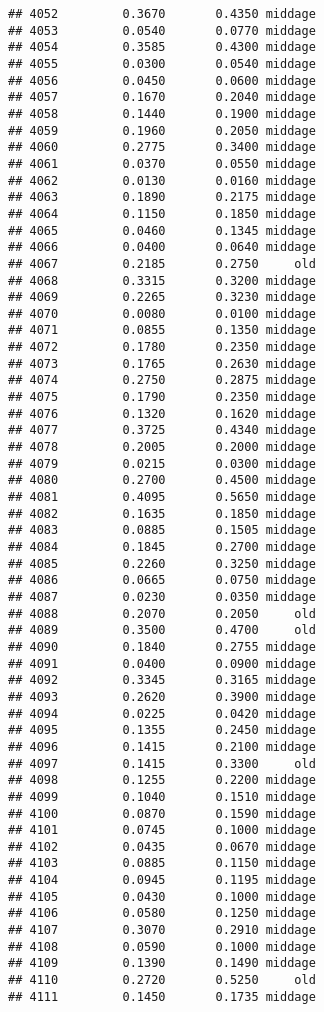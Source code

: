 \documentclass[
]{article}
\begin{document}
\begin{verbatim}
## 4052         0.3670       0.4350 middage
## 4053         0.0540       0.0770 middage
## 4054         0.3585       0.4300 middage
## 4055         0.0300       0.0540 middage
## 4056         0.0450       0.0600 middage
## 4057         0.1670       0.2040 middage
## 4058         0.1440       0.1900 middage
## 4059         0.1960       0.2050 middage
## 4060         0.2775       0.3400 middage
## 4061         0.0370       0.0550 middage
## 4062         0.0130       0.0160 middage
## 4063         0.1890       0.2175 middage
## 4064         0.1150       0.1850 middage
## 4065         0.0460       0.1345 middage
## 4066         0.0400       0.0640 middage
## 4067         0.2185       0.2750     old
## 4068         0.3315       0.3200 middage
## 4069         0.2265       0.3230 middage
## 4070         0.0080       0.0100 middage
## 4071         0.0855       0.1350 middage
## 4072         0.1780       0.2350 middage
## 4073         0.1765       0.2630 middage
## 4074         0.2750       0.2875 middage
## 4075         0.1790       0.2350 middage
## 4076         0.1320       0.1620 middage
## 4077         0.3725       0.4340 middage
## 4078         0.2005       0.2000 middage
## 4079         0.0215       0.0300 middage
## 4080         0.2700       0.4500 middage
## 4081         0.4095       0.5650 middage
## 4082         0.1635       0.1850 middage
## 4083         0.0885       0.1505 middage
## 4084         0.1845       0.2700 middage
## 4085         0.2260       0.3250 middage
## 4086         0.0665       0.0750 middage
## 4087         0.0230       0.0350 middage
## 4088         0.2070       0.2050     old
## 4089         0.3500       0.4700     old
## 4090         0.1840       0.2755 middage
## 4091         0.0400       0.0900 middage
## 4092         0.3345       0.3165 middage
## 4093         0.2620       0.3900 middage
## 4094         0.0225       0.0420 middage
## 4095         0.1355       0.2450 middage
## 4096         0.1415       0.2100 middage
## 4097         0.1415       0.3300     old
## 4098         0.1255       0.2200 middage
## 4099         0.1040       0.1510 middage
## 4100         0.0870       0.1590 middage
## 4101         0.0745       0.1000 middage
## 4102         0.0435       0.0670 middage
## 4103         0.0885       0.1150 middage
## 4104         0.0945       0.1195 middage
## 4105         0.0430       0.1000 middage
## 4106         0.0580       0.1250 middage
## 4107         0.3070       0.2910 middage
## 4108         0.0590       0.1000 middage
## 4109         0.1390       0.1490 middage
## 4110         0.2720       0.5250     old
## 4111         0.1450       0.1735 middage

\end{verbatim}
\end{document}
